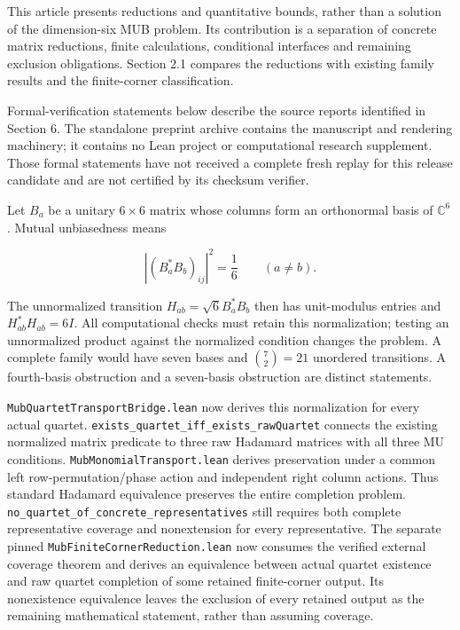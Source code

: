\documentclass[
]{article}
\begin{document}
This article presents reductions and quantitative bounds, rather than a
solution of the dimension-six MUB problem. Its contribution is a
separation of concrete matrix reductions, finite calculations,
conditional interfaces and remaining exclusion obligations. Section 2.1
compares the reductions with existing family results and the
finite-corner classification.

Formal-verification statements below describe the source reports
identified in Section 6. The standalone preprint archive contains the
manuscript and rendering machinery; it contains no Lean project or
computational research supplement. Those formal statements have not
received a complete fresh replay for this release candidate and are not
certified by its checksum verifier.

Let \(B_a\) be a unitary \(6\times6\) matrix whose columns form an
orthonormal basis of \(\mathbb C^6\). Mutual unbiasedness means

\[
|(B_a^*B_b)_{ij}|^2=\frac16\qquad(a\ne b).
\]

The unnormalized transition \(H_{ab}=\sqrt6 B_a^*B_b\) then has
unit-modulus entries and \(H_{ab}^*H_{ab}=6I\). All computational checks
must retain this normalization; testing an unnormalized product against
the normalized condition changes the problem. A complete family would
have seven bases and \(\binom72=21\) unordered transitions. A
fourth-basis obstruction and a seven-basis obstruction are distinct
statements.

\nolinkurl{MubQuartetTransportBridge.lean} now derives this
normalization for every actual quartet.
\nolinkurl{exists_quartet_iff_exists_rawQuartet} connects the existing
normalized matrix predicate to three raw Hadamard matrices with all
three MU conditions. \nolinkurl{MubMonomialTransport.lean} derives
preservation under a common left row-permutation/phase action and
independent right column actions. Thus standard Hadamard equivalence
preserves the entire completion problem.
\nolinkurl{no_quartet_of_concrete_representatives} still requires both
complete representative coverage and nonextension for every
representative. The separate pinned
\nolinkurl{MubFiniteCornerReduction.lean} now consumes the verified
external coverage theorem and derives an equivalence between actual
quartet existence and raw quartet completion of some retained
finite-corner output. Its nonexistence equivalence leaves the exclusion
of every retained output as the remaining mathematical statement, rather
than assuming coverage.
\end{document}
